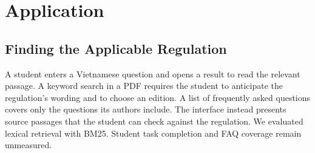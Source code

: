 \section{Application}
\label{sec:app}
\subsection{Finding the Applicable Regulation}
A student enters a Vietnamese question and opens a result to read the
relevant passage. A keyword search in a PDF requires the student to
anticipate the regulation's wording and to choose an edition. A list of
frequently asked questions covers only the questions its authors include.
The interface instead presents source passages that the student can
check against the regulation. We evaluated lexical retrieval with BM25.
Student task completion and FAQ coverage remain unmeasured.

